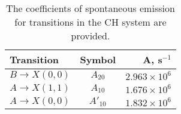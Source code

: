 \begin{table}
  \caption[Einstein A coefficients]{The coefficients of spontaneous emission for transitions in the CH system are provided.}
  \begin{center}
    \begin{tabular}{lcr}
      Transition & Symbol & A, s\(^{-1}\) \tabularnewline
      \hline\hline
      \(B\rightarrow X(0,0)\) & \(A_{20}\) & \(2.963 \times 10^6\) \tabularnewline
      \(A\rightarrow X(1,1)\) & \(A_{10}\) & \(1.676 \times 10^6\) \tabularnewline
      \(A\rightarrow X(0,0)\) & \(A'_{10}\) & \(1.832 \times 10^6\) \tabularnewline
    \end{tabular}
  \end{center}
  \label{tab:emissionCoefficients}
\end{table}
